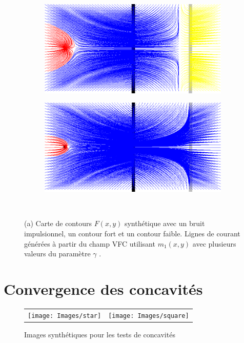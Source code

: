 \begin{figure}[!h]
   \begin{subfigure}[c]{.5\linewidth}
     \centering
     \includegraphics[scale=0.35]{Chapters/Images/synthetic_map_VFC_gamma017.png}
     \caption{}
   \end{subfigure}
   \begin{subfigure}[c]{.5\linewidth}
     \centering
     \includegraphics[scale=0.35]{Chapters/Images/synthetic_map_VFC_gamma011.png}
     \caption{}
   \end{subfigure}\\
   
   \caption{(a) Carte de contours $F(x,y)$ synthétique avec un bruit impulsionnel, un contour fort et un contour faible. Lignes de courant générées à partir du champ VFC utilisant $m_1(x,y)$ avec plusieurs valeurs du paramètre $\gamma$ .}
   \label{fig:synthetic_map}
\end{figure}

\section{Convergence des concavités}
\begin{figure}[H]
\begin{tabular}{cc}
\texttt{[image: Images/star]}
&
\texttt{[image: Images/square]}
\end{tabular}
\caption{Images synthétiques pour les tests de concavités}
\label{fig:ann_synthetic_star_square}
\end{figure}

